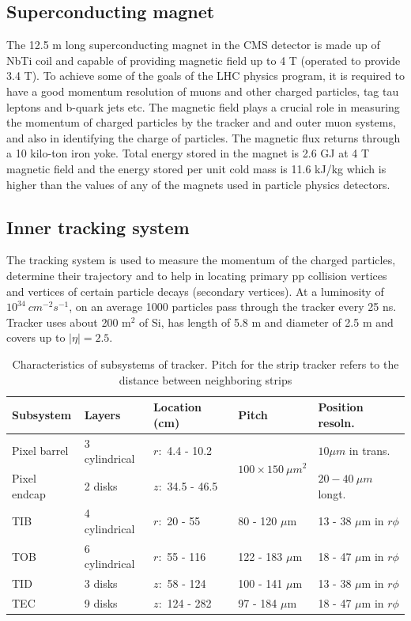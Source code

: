 \subsection{Superconducting magnet}
The 12.5 m long superconducting magnet in the CMS detector is made up of NbTi coil and capable of providing magnetic field up to 4 T 
(operated to provide 3.4 T). To achieve some of the goals of the LHC physics program, it is required 
to have a good momentum resolution of muons and other charged 
particles, tag tau leptons and b-quark jets etc. The magnetic field plays a crucial role in measuring the momentum of charged particles by 
the tracker and and outer muon systems, and also in identifying the charge of particles. The magnetic flux returns through a 10 kilo-ton 
iron yoke. Total energy stored in the magnet is 2.6 GJ at 4 T magnetic field and the energy stored per unit cold mass is 11.6 kJ/kg which 
is higher than the values of any of the magnets used in particle physics detectors.
\subsection{Inner tracking system}
The tracking system is used to measure the momentum of the charged particles, determine their trajectory and to help in locating primary 
pp collision vertices and vertices of certain particle decays (secondary vertices). At a luminosity of $10^{34}\ cm^{-2}s^{-1}$, on an 
average 1000 particles pass through the tracker every 25 ns. 
Tracker uses about 200 m$^2$ of Si, has length of 5.8 m and diameter of 2.5 m and covers up to $|\eta| = 2.5$. 

\begin{table}[h!]
\centering
\caption[Characteristics of tracker]{Characteristics of subsystems of tracker. Pitch for the strip tracker refers to the distance between neighboring strips}
\label{tab:tracker}
\begin{tabular}{lllll}
\hline
Subsystem	&	Layers	&	Location (cm)	&	Pitch	&		Position resoln.\\\hline
Pixel barrel&	3 cylindrical	&	$r:$ 4.4 - 10.2 &	\multirow{2}{*}{$100\times150\ \mu m^2$}	&	$10\mu m$ in trans.\\
Pixel endcap&	2 disks	&		$z:$ 34.5 - 46.5	&		&	 $20-40\ \mu m$ longt.\\\hline
TIB			&	4 cylindrical & $r:$ 20 - 55 &	80 - 120 $\mu$m &	13 - 38 $\mu$m in $r\phi$\\\hline
TOB			&	6 cylindrical &	$r:$ 55 - 116&	122 - 183 $\mu$m &	18 - 47 $\mu$m in $r\phi$\\\hline
TID			&	3 disks		  &	$z:$ 58 - 124&	100 - 141 $\mu$m &	13 - 38 $\mu$m in $r\phi$\\\hline
TEC			&	9 disks		  &	$z:$ 124 - 282&	97 - 184 $\mu$m &	18 - 47 $\mu$m in $r\phi$\\\hline
\end{tabular}
\end{table}

